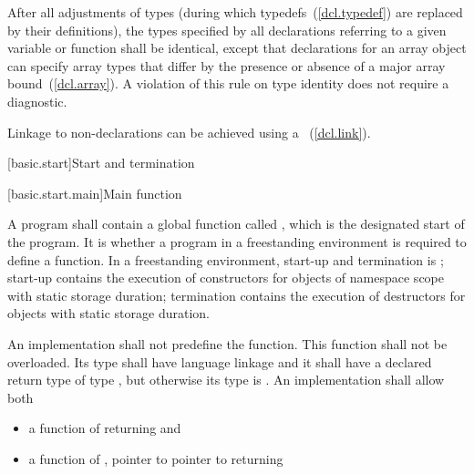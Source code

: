 \pnum
{}%
%
After all adjustments of types (during which
typedefs~(\ref{dcl.typedef}) are replaced by their definitions), the
types specified by all declarations referring to a given variable or
function shall be identical, except that declarations for an array
object can specify array types that differ by the presence or absence of
a major array bound~(\ref{dcl.array}). A violation of this rule on type
identity does not require a diagnostic.

\pnum
\enternote Linkage to non-\Cpp declarations can be achieved using a
~(\ref{dcl.link}). \exitnote%

[basic.start]{Start and termination}

[basic.start.main]{Main function}

\pnum
{}%
%
A program shall contain a global function called , which is the designated
start of the program. It is 
whether a program in a freestanding environment is required to define a 
function. \enternote In a freestanding environment, start-up and termination is
; start-up contains the
execution of constructors for objects of namespace scope with static storage duration;
termination contains the execution of destructors for objects with static storage
duration. \exitnote

\pnum
An implementation shall not predefine the  function. This
function shall not be overloaded.  Its type shall have \Cpp language linkage
and it shall have a declared return type of type
, but otherwise its type is .
%
An implementation shall allow both

\begin{itemize}
\item a function of \tcode{()} returning  and
\item a function of , pointer to pointer to  returning 
\end{itemize}

